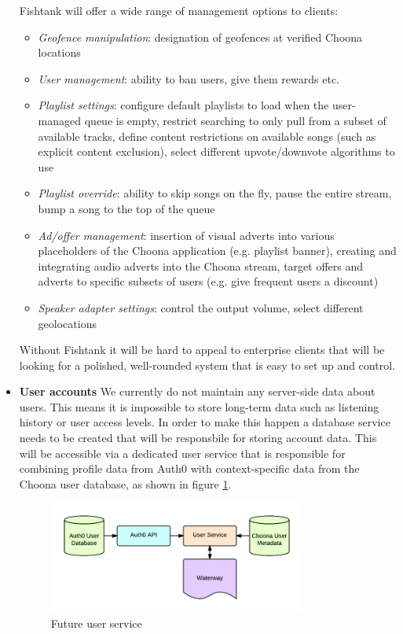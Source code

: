 \begin{itemize}
    Fishtank will offer a wide range of management options to clients:
    \begin{itemize}
      \item \textit{Geofence manipulation}: designation of geofences at verified Choona locations
      \item \textit{User management}: ability to ban users, give them rewards etc.
      \item \textit{Playlist settings}: configure default playlists to load when the user-managed queue is empty, restrict searching to only pull from a subset of available tracks, define content restrictions on available songs (such as explicit content exclusion), select different upvote/downvote algorithms to use
      \item \textit{Playlist override}: ability to skip songs on the fly, pause the entire stream, bump a song to the top of the queue
      \item \textit{Ad/offer management}: insertion of visual adverts into various placeholders of the Choona application (e.g. playlist banner), creating and integrating audio adverts into the Choona stream, target offers and adverts to specific subsets of users (e.g. give frequent users a discount)
      \item \textit{Speaker adapter settings}: control the output volume, select different geolocations
    \end{itemize}

    Without Fishtank it will be hard to appeal to enterprise clients that will be looking for a polished, well-rounded system that is easy to set up and control.

  \item \textbf{User accounts}
    We currently do not maintain any server-side data about users. This means it is impossible to store long-term data such as listening history or user access levels. In order to make this happen a database service needs to be created that will be responsbile for storing account data. This will be accessible via a dedicated user service that is responsible for combining profile data from Auth0 with context-specific data from the Choona user database, as shown in figure \ref{fig:user-service}.

    \begin{figure}[h!]
      \centering
      \includegraphics[width=0.8\textwidth]{./img/userservice.png}
      \caption{Future user service}
      \label{fig:user-service}
    \end{figure}


\end{itemize}
